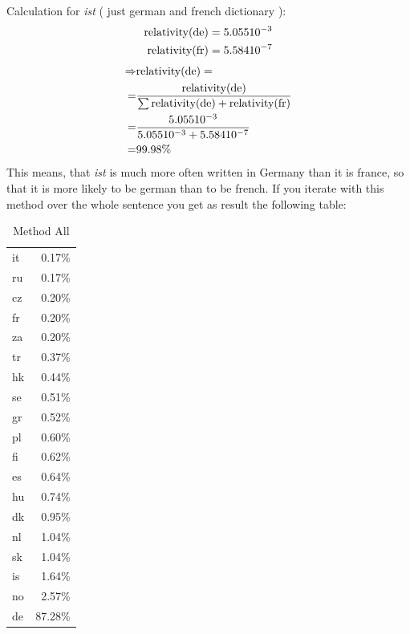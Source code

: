 Calculation for {\it ist} ( just german and french dictionary ):
\begin{eqnarray}
{\rm relativity(de)}		&= 5.055 10^{-3}	\nonumber \\
{\rm relativity(fr)}		&= 5.584 10^{-7}	\nonumber
\end{eqnarray}
\begin{eqnarray}
\Rightarrow &{\rm relativity(de)} = 	\nonumber \\
	= &\frac{\rm relativity(de)}{\sum{ {\rm relativity(de)} + {\rm relativity(fr)}} }		\nonumber \\
	= &\frac{5.055 10^{-3}}{5.055 10^{-3} + 5.584 10^{-7}}						\nonumber	\\
	= &99.98 \%																	\nonumber
\end{eqnarray}
This means, that {\it ist} is much more often written in Germany than it is france, so that it is more likely to be german than to be french. If you iterate with this method over the whole sentence you get as result the following table:
\begin{table}
\begin{center}
\begin{tabular}{|l|r|}
\hline
it    &0.17\% 	\\
ru    &0.17\% 	\\
cz    &0.20\% 	\\
fr    &0.20\% 	\\
za    &0.20\% 	\\
tr    &0.37\% 	\\
hk    &0.44\% 	\\
se    &0.51\% 	\\
gr    &0.52\% 	\\
pl    &0.60\% 	\\
fi    &0.62\% 	\\
es    &0.64\% 	\\
hu    &0.74\% 	\\
dk    &0.95\% 	\\
nl    &1.04\% 	\\
sk    &1.04\% 	\\
is    &1.64\% 	\\
no    &2.57\% 	\\
de    &87.28\%	\\
\hline
\end{tabular}
\end{center}
\caption{Method All}
\end{table}

